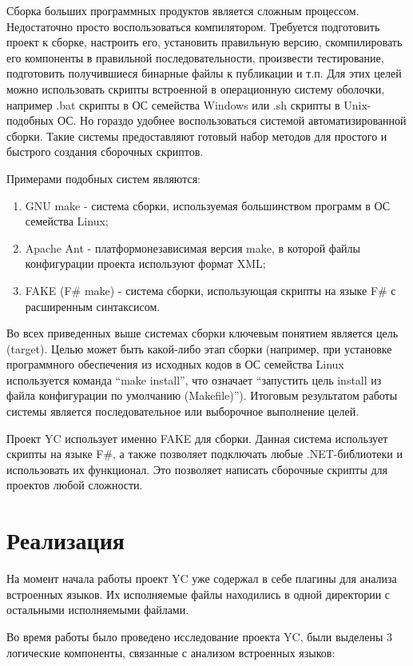 \documentclass{matmex-diploma}
\begin{document}
Сборка больших программных продуктов является сложным процессом. Недостаточно просто воспользоваться компилятором. Требуется подготовить проект к сборке, настроить его, установить правильную версию, скомпилировать его компоненты в правильной последовательности, произвести тестирование, подготовить получившиеся бинарные файлы к публикации и т.п. Для этих целей можно использовать скрипты встроенной в операционную систему оболочки, например .bat скрипты в ОС семейства Windows или .sh скрипты в Unix-подобных ОС. Но гораздо удобнее воспользоваться системой автоматизированной сборки. Такие системы предоставляют готовый набор методов для простого и быстрого создания сборочных скриптов.

Примерами подобных систем являются:

\begin{enumerate}
\item
GNU make - система сборки, используемая большинством программ в ОС семейства Linux;
\item
Apache Ant - платформонезависимая версия make, в которой файлы конфигурации проекта используют формат XML;
\item
FAKE (F\# make) - система сборки, использующая скрипты на языке F\# с расширенным синтаксисом.
\end{enumerate}

Во всех приведенных выше системах сборки ключевым понятием является цель (target). Целью может быть какой-либо этап сборки (например, при установке программного обеспечения из исходных кодов в ОС семейства Linux используется команда “make install”, что означает “запустить цель install из файла конфигурации по умолчанию (Makefile)”). Итоговым результатом работы системы является последовательное или выборочное выполнение целей.

Проект YC использует именно FAKE для сборки. Данная система использует скрипты на языке F\#, а также позволяет подключать любые .NET-библиотеки и использовать их функционал. Это позволяет написать сборочные скрипты для проектов любой сложности.

\section{Реализация}

На момент начала работы проект YC уже содержал в себе плагины для анализа встроенных языков. Их исполняемые файлы находились в одной директории с остальными исполняемыми файлами.

Во время работы было проведено исследование проекта YC, были выделены 3 логические компоненты, связанные с анализом встроенных языков:
\end{document}
